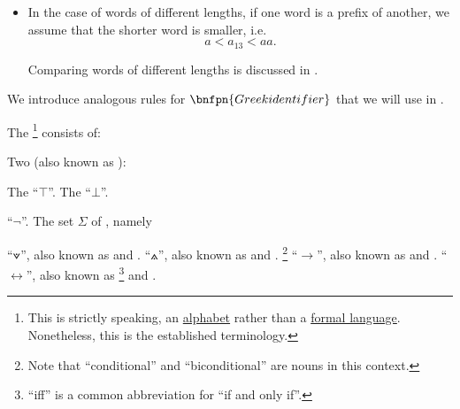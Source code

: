 \begin{remark}
\begin{itemize}
    \item In the case of words of different lengths, if one word is a prefix of another, we assume that the shorter word is smaller, i.e.
    \begin{equation*}
      a < a_{13} < aa.
    \end{equation*}

    Comparing words of different lengths is discussed in .
  \end{itemize}

  We introduce analogous rules for \( \bnfpn{Greek identifier} \) that we will use in .
\end{remark}

\begin{definition}\label{def:propositional_language}
  The \footnote{This is strictly speaking, an \hyperref[def:formal_language]{alphabet} rather than a \hyperref[def:formal_language/language]{formal language}. Nonetheless, this is the established terminology.} consists of:

  \begin{thmenum}
     Two  (also known as ):
    \begin{thmenum}
       The  \enquote{\( \top \)}.
       The  \enquote{\( \bot \)}.
    \end{thmenum}

      \enquote{\( \neg \)}.
     The set \( \Sigma \) of , namely
    \begin{thmenum}
        \enquote{\( \veedot \)}, also known as \hyperref[def:standard_boolean_operators]{} and \hyperref[def:lattice/join]{}.
        \enquote{\( \wedgedot \)}, also known as \hyperref[def:standard_boolean_operators]{} and \hyperref[def:lattice/meet]{}.
       \footnote{Note that \enquote{conditional} and \enquote{biconditional} are nouns in this context.} \enquote{\( \rightarrow \)}, also known as  and \hyperref[def:material_implication]{}.
        \enquote{\( \leftrightarrow \)}, also known as \footnote{\enquote{iff} is a common abbreviation for \enquote{if and only if}.} and .
    \end{thmenum}


\end{thmenum}
\end{definition}

